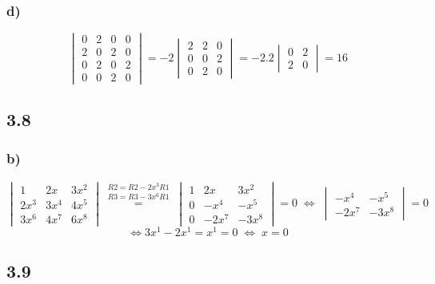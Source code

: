 \documentclass[11pt]{article}
\begin{document}
\subsubsection*{d)}
\[
\begin{vmatrix}
0 & 2 & 0 & 0 \\
2 & 0 & 2 & 0 \\
0 & 2 & 0 & 2 \\
0 & 0 & 2 & 0
\end{vmatrix}
=
-2\begin{vmatrix}
2 & 2 & 0\\
0 & 0 & 2\\
0 & 2 & 0
\end{vmatrix}
=-2.2\begin{vmatrix}
0 & 2 \\
2 & 0
\end{vmatrix}
=16
\]

\subsection*{3.8}
\subsubsection*{b)}
\[
\begin{vmatrix}
1 & 2x & 3x^2\\
2x^3 & 3x^4 & 4x^5\\
3x^6 & 4x^7 & 6x^8
\end{vmatrix}
\overset{\begin{matrix}
R2 = R2-2x^3R1\\
R3 = R3-3x^6R1
\end{matrix}}{=}
\begin{vmatrix}
1 & 2x & 3x^2\\
0 & -x^4 & -x^5\\
0 & -2x^7 & -3x^8
\end{vmatrix}
=0\;\Leftrightarrow\;
\begin{vmatrix}
-x^4 & -x^5\\
-2x^7 & -3x^8
\end{vmatrix}=0
\]
\[\Leftrightarrow 3x^1 - 2x^1 = x ^1 = 0\;
\Leftrightarrow\;x=0
\]

\subsection*{3.9}
\end{document}
